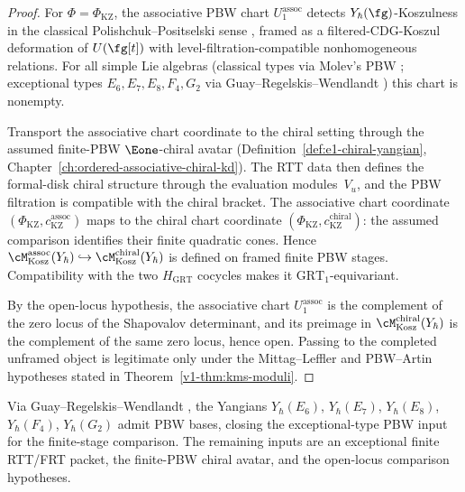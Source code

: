 \begin{proof}
For $\Phi = \Phi_{\mathrm{KZ}}$, the associative PBW chart
$U_1^{\mathrm{assoc}}$ detects $Y_\hbar(\fg)$-Koszulness in
the classical Polishchuk--Positselski sense
\cite{Positselski11}, framed as a filtered-CDG-Koszul
deformation of $U(\fg[t])$ with level-filtration-compatible
nonhomogeneous relations. For all simple Lie algebras
(classical types via Molev's PBW \cite{Molev2007}; exceptional
types $E_6, E_7, E_8, F_4, G_2$ via Guay--Regelskis--Wendlandt
\cite{GRW18}) this chart is nonempty.

Transport the associative chart coordinate to the chiral
setting through the assumed finite-PBW $\Eone$-chiral avatar
(Definition~\ref{def:e1-chiral-yangian},
Chapter~\ref{ch:ordered-associative-chiral-kd}). The RTT data
then defines the formal-disk chiral structure through the
evaluation modules~$V_u$, and the PBW filtration is compatible with the
chiral bracket. The associative chart coordinate
$(\Phi_{\mathrm{KZ}}, c^{\mathrm{assoc}}_{\mathrm{KZ}})$ maps
to the chiral chart coordinate
$(\Phi_{\mathrm{KZ}}, c^{\mathrm{chiral}}_{\mathrm{KZ}})$:
the assumed comparison identifies their finite quadratic cones.
Hence
$\cM^{\mathrm{assoc}}_{\mathrm{Kosz}}(Y_\hbar)
\hookrightarrow
\cM^{\mathrm{chiral}}_{\mathrm{Kosz}}(Y_\hbar)$
is defined on framed finite PBW stages.  Compatibility with the two
$H_{\mathrm{GRT}}$ cocycles makes it $\mathrm{GRT}_1$-equivariant.

By the open-locus hypothesis, the associative chart
$U_1^{\mathrm{assoc}}$ is the complement of the zero locus of the
Shapovalov determinant, and its preimage in
$\cM^{\mathrm{chiral}}_{\mathrm{Kosz}}(Y_\hbar)$ is the
complement of the same zero locus, hence open. Passing to the
completed unframed object is legitimate only under the
Mittag--Leffler and PBW--Artin hypotheses stated in
Theorem~\ref{v1-thm:kms-moduli}.
\end{proof}

\begin{corollary}
\label{v1-cor:kms-exceptional-PBW}
\ClaimStatusProvedElsewhere
Via Guay--Regelskis--Wendlandt \cite{GRW18}, the Yangians
$Y_\hbar(E_6)$, $Y_\hbar(E_7)$, $Y_\hbar(E_8)$,
$Y_\hbar(F_4)$, $Y_\hbar(G_2)$ admit PBW bases, closing the
exceptional-type PBW input for the finite-stage comparison.  The
remaining inputs are an exceptional finite RTT/FRT packet, the
finite-PBW chiral avatar, and the open-locus comparison hypotheses.
\end{corollary}

